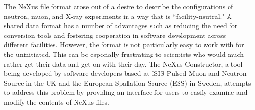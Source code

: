 The NeXus file format arose out of a desire to describe the configurations of neutron, muon, and X-ray experiments in a way that is ``facility-neutral." A shared data format has a number of advantages such as reducing the need for conversion tools and fostering cooperation in software development across different facilities. However, the format is not particularly easy to work with for the uninitiated. This can be especially frustrating to scientists who would much rather get their data and get on with their day. The NeXus Constructor, a tool being developed by software developers based at ISIS Pulsed Muon and Neutron Source in the UK and the European Spallation Source (ESS) in Sweden, attempts to address this problem by providing an interface for users to easily examine and modify the contents of NeXus files.

